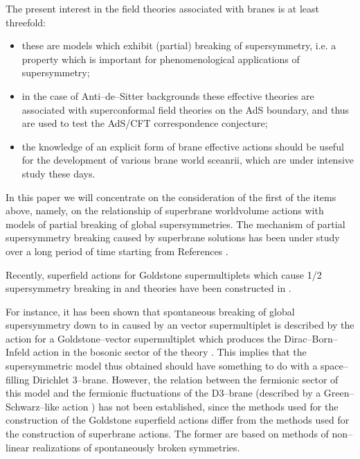 \documentclass[a4paper,12pt]{article}
\begin{document}
The present interest in the field theories associated with branes
is at least threefold:
\begin{itemize}
\item
these are models which exhibit (partial) breaking of
supersymmetry, i.e. a property which is important for
phenomenological applications of supersymmetry;
\item
in the case of Anti--de--Sitter backgrounds these effective
theories are associated with superconformal field theories on the
AdS boundary, and thus are used to test the AdS/CFT correspondence
conjecture;
\item
the knowledge of an explicit form of brane effective actions
should be useful for the development of various brane world
sceanrii, which are under intensive study these days.
\end{itemize}

In this paper we will concentrate on the consideration of the
first of the items above, namely, on the relationship of
superbrane worldvolume actions with models of partial breaking of
global supersymmetries. The mechanism of partial supersymmetry
breaking caused by superbrane solutions has been under study over
a long period of time starting from References \cite{polch,achu}.

Recently, superfield actions for Goldstone supermultiplets which
cause 1/2 supersymmetry breaking in \coordHE{} and \coordHE{} theories have
been constructed in
\cite{bg2,rt,ik1}.

For instance, it has been shown \cite{bg2} that spontaneous
breaking of global \coordHE{} supersymmetry down to \coordHE{} in \coordHE{}
caused by an
\coordHE{} vector supermultiplet is described by the action for a
Goldstone--vector supermultiplet which produces the
Dirac--Born--Infeld action in the bosonic sector of the theory
\cite{fer}. This implies that the supersymmetric model thus obtained
should have something to do with a space--filling Dirichlet
3--brane. However, the relation between the fermionic sector of
this model and the fermionic fluctuations of the D3--brane
(described by a Green--Schwarz--like action \cite{d3}) has not
been established, since the methods used for the construction of
the Goldstone superfield actions differ from the methods used for
the construction of superbrane actions. The former are based on
methods of non--linear realizations of spontaneously broken
symmetries.
\end{document}
